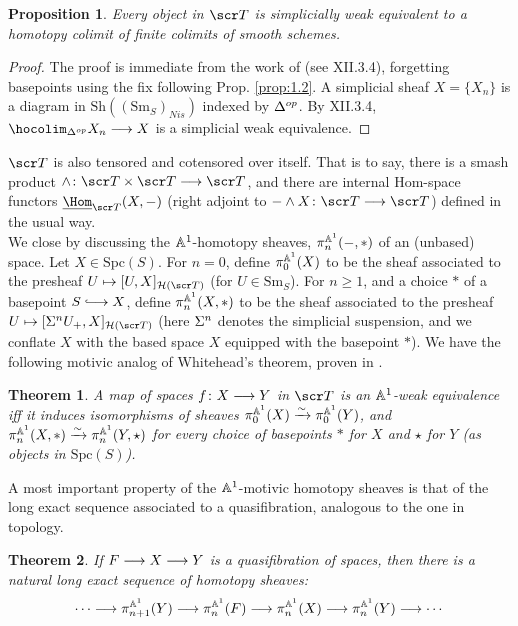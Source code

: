 \documentclass{amsart}
\newtheorem{thm}{Theorem}[section]
\newtheorem{prop}{Proposition}[section]
\theoremstyle{definition}
\begin{document}
\begin{prop}
Every object in $\sT$ is simplicially weak equivalent to a homotopy colimit of finite colimits of smooth schemes. 
\end{prop}
\begin{proof}
The proof is immediate from the work of \cite{bousfield1972homotopy} (see XII.3.4), forgetting basepoints using the fix following Prop. \ref{prop:1.2}. A simplicial sheaf $X = \{X_n\}$ is a diagram in $\mathrm{Sh}((\mathrm{Sm}_S)_{Nis})$ indexed by $\Delta^{op}$. By \cite{bousfield1972homotopy} XII.3.4, $\hocolim_{\DE^{op}} X_n \rtarr X$ is a simplicial weak equivalence.
\end{proof}

$\sT$ is also tensored and cotensored over itself. That is to say, there is a smash product $\wedge \colon \sT \times \sT \rtarr \sT$, and there are internal Hom-space functors $\underline{\Hom}_{\sT} (X, -)$ (right adjoint to $- \wedge X \colon \sT \rtarr \sT$) defined in the usual way.\\

We close by discussing the $\mathbb{A}^1$-homotopy sheaves, $\pi^{\mathbb{A}^1}_n(-,*)$ of an (unbased) space. Let $X \in \mathrm{Spc}(S)$. For $n=0$, define $\pi_0^{\mathbb{A}^1}(X)$ to be the sheaf associated to the presheaf $U \mapsto [U,X]_{\oH(\sT)}$ (for $U \in \mathrm{Sm}_S$). For $n \geq 1$, and a choice $*$ of a basepoint $S \monoto X$, define $\pi_n^{\mathbb{A}^1}(X,*)$ to be the sheaf associated to the presheaf $U \mapsto [\SI^n U_+, X]_{\oH(\sT)}$ (here $\Sigma^n$ denotes the simplicial suspension, and we conflate $X$ with the based space $X$ equipped with the basepoint $*$). We have the following motivic analog of Whitehead's theorem, proven in \cite{MV99}.

\begin{thm}\label{thm:1.1}
A map of spaces $f \colon X \longrightarrow Y$ in $\sT$ is an $\mathbb{A}^1$-weak equivalence iff it induces isomorphisms of sheaves $\pi_0^{\mathbb{A}^1}(X) \xrightarrow{\sim} \pi_0^{\mathbb{A}^1}(Y)$, and $\pi_n^{\mathbb{A}^1}(X,*) \xrightarrow{\sim} \pi_n^{\mathbb{A}^1}(Y,\star)$ for every choice of basepoints $*$ for $X$ and $\star$ for $Y$ (as objects in $\mathrm{Spc}(S)$). 
\end{thm}

A most important property of the $\mathbb{A}^1$-motivic homotopy sheaves is that of the long exact sequence associated to a quasifibration, analogous to the one in topology.

\begin{thm}\label{thm:1.2}
If $F \longrightarrow X \longrightarrow Y$ is a quasifibration of spaces, then there is a natural long exact sequence of homotopy sheaves:
\[\cdots \longrightarrow \pi^{\mathbb{A}^1}_{n+1}(Y) \longrightarrow \pi^{\mathbb{A}^1}_n(F) \longrightarrow \pi_n^{\mathbb{A}^1}(X) \longrightarrow \pi^{\mathbb{A}^1}_n(Y) \longrightarrow \cdots\]
\end{thm}
\end{document}
